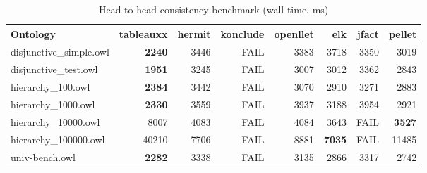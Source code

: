 \begin{table}[t]
\centering
\caption{Head-to-head consistency benchmark (wall time, ms)}
\label{tab:head_to_head_wall_ms}
\begin{tabular}{lrrrrrrr}
\toprule
Ontology & tableauxx & hermit & konclude & openllet & elk & jfact & pellet \\
\midrule
disjunctive\_simple.owl & \textbf{2240} & 3446 & FAIL & 3383 & 3718 & 3350 & 3019 \\
disjunctive\_test.owl & \textbf{1951} & 3245 & FAIL & 3007 & 3012 & 3362 & 2843 \\
hierarchy\_100.owl & \textbf{2384} & 3442 & FAIL & 3070 & 2910 & 3271 & 2883 \\
hierarchy\_1000.owl & \textbf{2330} & 3559 & FAIL & 3937 & 3188 & 3954 & 2921 \\
hierarchy\_10000.owl & 8007 & 4083 & FAIL & 4084 & 3643 & FAIL & \textbf{3527} \\
hierarchy\_100000.owl & 40210 & 7706 & FAIL & 8881 & \textbf{7035} & FAIL & 11485 \\
univ-bench.owl & \textbf{2282} & 3338 & FAIL & 3135 & 2866 & 3317 & 2742 \\
\bottomrule
\end{tabular}
\end{table}
